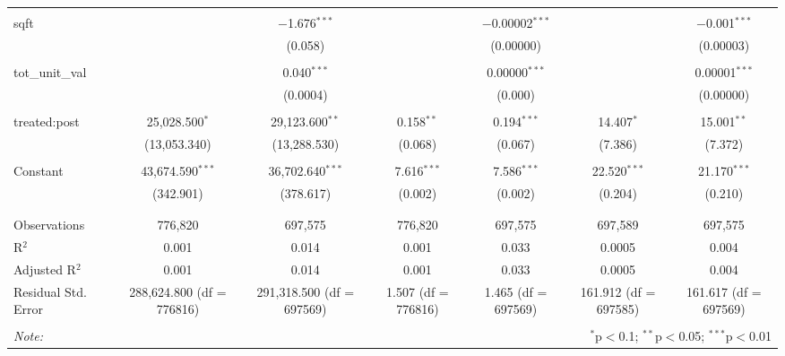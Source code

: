 \begin{table}[H]
{\begin{tabular}{@{\extracolsep{5pt}}lcccccc}
   & & & & & & \\  

  sqft &  & $-$1.676$^{***}$ &  & $-$0.00002$^{***}$ &  & $-$0.001$^{***}$ \\  

   &  & (0.058) &  & (0.00000) &  & (0.00003) \\  

   & & & & & & \\  

  tot\_unit\_val &  & 0.040$^{***}$ &  & 0.00000$^{***}$ &  & 0.00001$^{***}$ \\  

   &  & (0.0004) &  & (0.000) &  & (0.00000) \\  

   & & & & & & \\  

  treated:post & 25,028.500$^{*}$ & 29,123.600$^{**}$ & 0.158$^{**}$ & 0.194$^{***}$ & 14.407$^{*}$ & 15.001$^{**}$ \\  

   & (13,053.340) & (13,288.530) & (0.068) & (0.067) & (7.386) & (7.372) \\  

   & & & & & & \\  

  Constant & 43,674.590$^{***}$ & 36,702.640$^{***}$ & 7.616$^{***}$ & 7.586$^{***}$ & 22.520$^{***}$ & 21.170$^{***}$ \\  

   & (342.901) & (378.617) & (0.002) & (0.002) & (0.204) & (0.210) \\  

   & & & & & & \\  

 \hline \\[-1.8ex]  

 Observations & 776,820 & 697,575 & 776,820 & 697,575 & 697,589 & 697,575 \\  

 R$^{2}$ & 0.001 & 0.014 & 0.001 & 0.033 & 0.0005 & 0.004 \\  

 Adjusted R$^{2}$ & 0.001 & 0.014 & 0.001 & 0.033 & 0.0005 & 0.004 \\  

 Residual Std. Error & 288,624.800 (df = 776816) & 291,318.500 (df = 697569) & 1.507 (df = 776816) & 1.465 (df = 697569) & 161.912 (df = 697585) & 161.617 (df = 697569) \\  

 \hline  

 \hline \\[-1.8ex]  

 \textit{Note:}  & \multicolumn{6}{r}{$^{*}$p$<$0.1; $^{**}$p$<$0.05; $^{***}$p$<$0.01} \\  

 \end{tabular}}  

 \end{table}  

